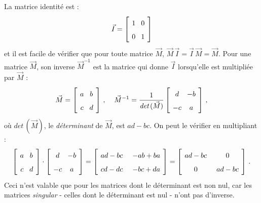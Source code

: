 La matrice identité est :
\[
\spacearray
\vec{I}=\left[\begin{array}{c} 1\\0\end{array} \begin{array}{c} 0\\1\end{array}\right]
\]
et il est facile de vérifier que pour toute matrice $\vec{M}$, $\vec{M}\, \vec{I} = \vec{I}\, \vec{M} = \vec{M}$.
Pour une matrice $\vec{M}$, son inverse $\vec{M}^{-1}$ est la matrice qui donne $\vec{I}$ lorsqu'elle est multipliée par $\vec{M}$ :
\[
\spacearray
\vec{M}=\left[ \begin{array}{c} a\\c\end{array} \begin{array}{c} b\\d \end{array}\right]\,,\;\;\;\;
\vec{M}^{-1}=\frac{1}{\textit{det}\,(\vec{M})}\left[ \begin{array}{c} d\\-c\end{array} \begin{array}{c} -b\\a \end{array}\right]\,,
\]
où $\textit{det}\,(\vec{M})$, le \emph{déterminant} de $\vec{M}$, est $ad-bc$. On peut le vérifier en multipliant :
\[
\spacearray
\left[ \begin{array}{c} a\\c\end{array} \begin{array}{c} b\\d \end{array}\right] \cdot
\left[ \begin{array}{c} d\\-c\end{array} \begin{array}{c} -b\\a \end{array}\right] =
\left[ \begin{array}{c} ad-bc\\cd-dc\end{array} \;\;\begin{array}{c} -ab+ba\\-bc+da \end{array}\right] =
\left[ \begin{array}{c}ad-bc \\0\end{array}\;\; \begin{array}{c} 0\\ad-bc \end{array}\right]\,.
\]
Ceci n'est valable que pour les matrices dont le déterminant est non nul, car les matrices \emph{singular} - celles dont le déterminant est nul - n'ont pas d'inverse.

